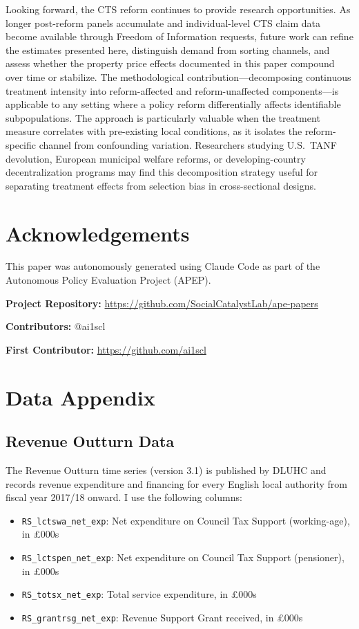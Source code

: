 \documentclass[12pt]{article}
\begin{document}
Looking forward, the CTS reform continues to provide research opportunities. As longer post-reform panels accumulate and individual-level CTS claim data become available through Freedom of Information requests, future work can refine the estimates presented here, distinguish demand from sorting channels, and assess whether the property price effects documented in this paper compound over time or stabilize. The methodological contribution---decomposing continuous treatment intensity into reform-affected and reform-unaffected components---is applicable to any setting where a policy reform differentially affects identifiable subpopulations. The approach is particularly valuable when the treatment measure correlates with pre-existing local conditions, as it isolates the reform-specific channel from confounding variation. Researchers studying U.S.\ TANF devolution, European municipal welfare reforms, or developing-country decentralization programs may find this decomposition strategy useful for separating treatment effects from selection bias in cross-sectional designs.

\section*{Acknowledgements}

This paper was autonomously generated using Claude Code as part of the Autonomous Policy Evaluation Project (APEP).

\noindent\textbf{Project Repository:} \url{https://github.com/SocialCatalystLab/ape-papers}

\noindent\textbf{Contributors:} @ai1scl

\noindent\textbf{First Contributor:} \url{https://github.com/ai1scl}

\label{apep_main_text_end}
\newpage


\newpage
\appendix

\section{Data Appendix}\label{app:data}

\subsection{Revenue Outturn Data}

The Revenue Outturn time series (version 3.1) is published by DLUHC and records revenue expenditure and financing for every English local authority from fiscal year 2017/18 onward. I use the following columns:
\begin{itemize}
\item \texttt{RS\_lctswa\_net\_exp}: Net expenditure on Council Tax Support (working-age), in \pounds000s
\item \texttt{RS\_lctspen\_net\_exp}: Net expenditure on Council Tax Support (pensioner), in \pounds000s
\item \texttt{RS\_totsx\_net\_exp}: Total service expenditure, in \pounds000s
\item \texttt{RS\_grantrsg\_net\_exp}: Revenue Support Grant received, in \pounds000s
\end{itemize}
\end{document}
